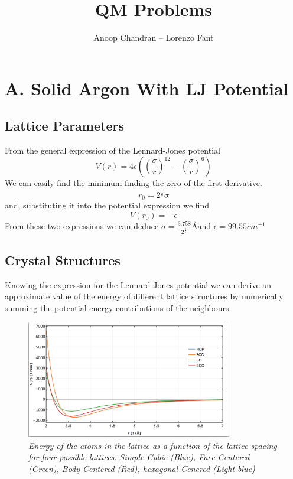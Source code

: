 \documentclass[a4paper]{article}
\title{QM Problems}
\author{Anoop Chandran -- Lorenzo Fant}
\begin{document}
\maketitle


\section{A. Solid Argon With LJ Potential}

\subsection{Lattice Parameters}
From the general expression of the Lennard-Jones potential
\begin{equation}
V(r) = 4\epsilon\left(\left(\frac{\sigma}{r}\right)^12-\left(\frac{\sigma}{r}\right)^6\right)
\end{equation}
We can easily find the minimum finding the zero of the first derivative.
\begin{equation}
r_0 = 2^{\frac{1}{6}}\sigma
\end{equation}
and, substituting it into the potential expression we find
\begin{equation}
V(r_0) = -\epsilon
\end{equation}
From these two expressions we can deduce $\sigma = \frac{3.758}{2^{\frac{1}{6}}}$\AA and $\epsilon = 99.55 cm^{-1}$
\subsection{Crystal Structures}
Knowing the expression for the Lennard-Jones potential we can derive an approximate value of the energy of different lattice structures by numerically summing the potential energy contributions of the neighbours.
\begin{figure}[h]
    \centering
    \includegraphics[width=9cm]{lj.png}
    \caption{\it \label{en(spacing)}Energy of the atoms in the lattice as a function of the lattice spacing for four possible lattices: Simple Cubic (Blue), Face Centered (Green), Body Centered (Red), hexagonal Cenered (Light blue)}
\end{figure}
    
\end{document}

